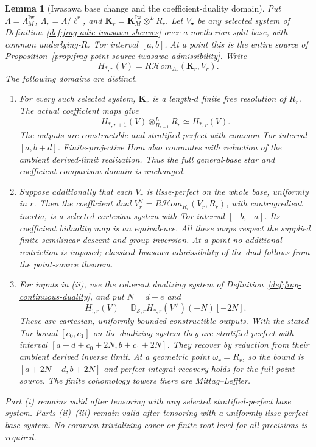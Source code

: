 \documentclass[11pt]{article}
\newtheorem{lemma}[theorem]{Lemma}
\theoremstyle{definition}
\theoremstyle{remark}
\begin{document}
\begin{lemma}[Iwasawa base change and the coefficient-duality domain]
\label{lem:frag-iwasawa-adic-base-change}
Put $\Lambda=\Lambda_M^{\mathrm{Iw}}$, $\Lambda_r=\Lambda/\ell^r$,
and $\mathbf K_r=\mathbf K_M^{\mathrm{Iw}}\otimes^L R_r$.
Let $V_\bullet$ be any selected system of
Definition~\ref{def:frag-adic-iwasawa-sheaves} over a noetherian split
base, with common underlying-$R_r$ Tor interval $[a,b]$.  At a point
this is the entire source of
Proposition~\ref{prop:frag-point-source-iwasawa-admissibility}.
Write
\[
 H_{*,r}(V)=R\mathcal Hom_{\Lambda_r}(\mathbf K_r,V_r).
\]
The following domains are distinct.
\begin{enumerate}[label=\textup{(\roman*)}]
\item For every such selected system, $\mathbf K_r$ is a length-$d$
finite free resolution of $R_r$.  The actual coefficient maps give
\[
 H_{*,r+1}(V)\otimes^L_{R_{r+1}}R_r\simeq H_{*,r}(V).
\]
The outputs are constructible and stratified-perfect with common
Tor interval $[a,b+d]$.  Finite-projective Hom also commutes with
reduction of the ambient derived-limit realization.  Thus the full
general-base star and coefficient-comparison domain is unchanged.
\item Suppose additionally that each $V_r$ is lisse-perfect on the
whole base, uniformly in $r$.  Then the coefficient dual
$V_r^\vee=R\mathcal Hom_{R_r}(V_r,R_r)$, with contragredient inertia,
is a selected cartesian system with Tor interval $[-b,-a]$.
Its coefficient biduality map is an equivalence.  All these maps
respect the supplied finite semilinear descent and group inversion.
At a point no additional restriction is imposed; classical
Iwasawa-admissibility of the dual follows from the point-source theorem.
\item For inputs in (ii), use the coherent dualizing system of
Definition~\ref{def:frag-continuous-duality}, and put $N=d+e$ and
\[
 H_{!,r}(V)=\mathbb D_{\mathscr S,r}H_{*,r}(V^\vee)(-N)[-2N].
\]
These are cartesian, uniformly bounded constructible outputs.
With the stated Tor bound $[c_0,c_1]$ on the dualizing system they
are stratified-perfect with interval
$[a-d+c_0+2N,b+c_1+2N]$.
They recover by reduction from their ambient derived inverse limit.
At a geometric point $\omega_r=R_r$, so the bound is
$[a+2N-d,b+2N]$ and perfect integral recovery holds for the full
point source.  The finite cohomology towers there are Mittag--Leffler.
\end{enumerate}
Part (i) remains valid after tensoring with any selected stratified-perfect
base system.  Parts (ii)--(iii) remain valid after tensoring with a
uniformly lisse-perfect base system.  No common trivializing cover
or finite root level for all precisions is required.
\end{lemma}
\end{document}
